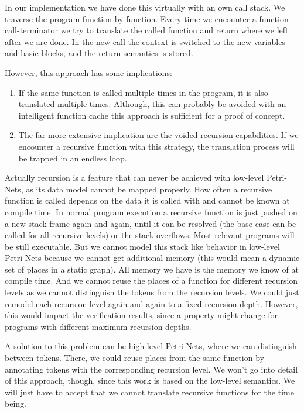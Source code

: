 In our implementation we have done this virtually with an own call stack.
We traverse the program function by function.
Every time we encounter a function-call-terminator we try to translate the called function and return where we left after we are done.
In the new call the context is switched to the new variables and basic blocks, and the return semantics is stored.

However, this approach has some implications:
\begin{enumerate}
    \item If the same function is called multiple times in the program, it is also translated multiple times.
    Although, this can probably be avoided with an intelligent function cache this approach is sufficient for a proof of concept.
    \item The far more extensive implication are the voided recursion capabilities.
    If we encounter a recursive function with this strategy, the translation process will be trapped in an endless loop.
\end{enumerate}
Actually recursion is a feature that can never be achieved with low-level Petri-Nets, as its data model cannot be mapped properly.
How often a recursive function is called depends on the data it is called with and cannot be known at compile time.
In normal program execution a recursive function is just pushed on a new stack frame again and again, until it can be resolved (the base case can be called for all recursive levels) or the stack overflows.
Most relevant programs will be still executable.
But we cannot model this stack like behavior in low-level Petri-Nets because we cannot get additional memory (this would mean a dynamic set of places in a static graph).
All memory we have is the memory we know of at compile time.
And we cannot reuse the places of a function for different recursion levels as we cannot distinguish the tokens from the recursion levels.
We could just remodel each recursion level again and again to a fixed recursion depth.
However, this would impact the verification results, since a property might change for programs with different maximum recursion depths.

A solution to this problem can be high-level Petri-Nets, where we can distinguish between tokens.
There, we could reuse places from the same function by annotating tokens with the corresponding recursion level.
We won't go into detail of this approach, though, since this work is based on the low-level semantics.
We will just have to accept that we cannot translate recursive functions for the time being.

